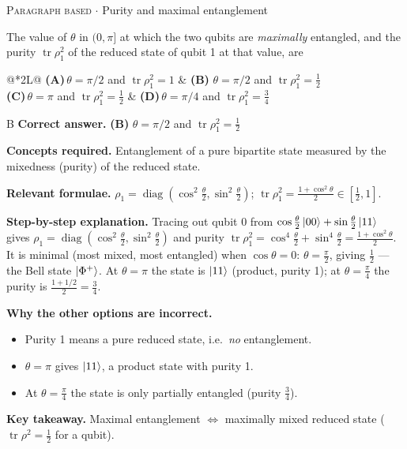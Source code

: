 \documentclass[11pt,a4paper]{article}
\newcommand{\optlabel}[1]{\textbf{(#1)}}
\newcommand{\correctlabel}[1]{\textcolor{okgreen}{\textbf{(#1)}\,\ding{51}}}
\newenvironment{qitem}[1]{\begin{list}{}{\setlength{\leftmargin}{3.3em}\setlength{\labelwidth}{3.1em}%
  \setlength{\labelsep}{0.2em}\setlength{\topsep}{3pt}\setlength{\parsep}{3pt}}\item[\textbf{Q.#1}\hfill]}{\end{list}}
\newcommand{\qsep}{\par\vspace{2pt}{\color{black!15}\hrule}\vspace{4pt}}
\newcommand{\qmeta}[2]{{\footnotesize\color{black!60}\textsc{#1} \;$\cdot$\; #2}\par}
\begin{document}
\begin{qitem}{40}
\qmeta{Paragraph based}{Purity and maximal entanglement}
The value of $\theta$ in $(0, \pi]$ at which the two qubits are \emph{maximally} entangled, and the purity
$\operatorname{tr}\rho_1^2$ of the reduced state of qubit 1 at that value, are
\par\smallskip\noindent\begin{tabularx}{\linewidth}{@{}*{2}{L}@{}}
\optlabel{A}\,$\theta = \pi/2$ and $\operatorname{tr}\rho_1^2 = 1$ & \correctlabel{B}\,$\theta = \pi/2$ and $\operatorname{tr}\rho_1^2 = \tfrac12$ \\[3pt]
\optlabel{C}\,$\theta = \pi$ and $\operatorname{tr}\rho_1^2 = \tfrac12$ & \optlabel{D}\,$\theta = \pi/4$ and $\operatorname{tr}\rho_1^2 = \tfrac34$
\end{tabularx}
\end{qitem}
\begin{solbox}{B}
\textbf{\color{brand}Correct answer.} \textcolor{okgreen}{\textbf{(B)}} $\theta = \pi/2$ and $\operatorname{tr}\rho_1^2 = \tfrac12$

\textbf{\color{brand}Concepts required.} Entanglement of a pure bipartite state measured by the mixedness (purity) of the reduced state.

\textbf{\color{brand}Relevant formulae.} $\rho_1 = \operatorname{diag}(\cos^2\frac\theta2, \sin^2\frac\theta2)$; $\operatorname{tr}\rho_1^2 = \frac{1 + \cos^2\theta}{2} \in [\frac12, 1]$.

\textbf{\color{brand}Step-by-step explanation.} Tracing out qubit 0 from $\cos\frac\theta2\ket{00} + \sin\frac\theta2\ket{11}$ gives $\rho_1 = \operatorname{diag}(\cos^2\frac\theta2, \sin^2\frac\theta2)$
and purity $\operatorname{tr}\rho_1^2 = \cos^4\frac\theta2 + \sin^4\frac\theta2 = \frac{1 + \cos^2\theta}{2}$. It is minimal (most mixed,
most entangled) when $\cos\theta = 0$: $\theta = \frac\pi2$, giving $\frac12$ --- the Bell state $\ket{\Phi^+}$.
At $\theta = \pi$ the state is $\ket{11}$ (product, purity 1); at $\theta = \frac\pi4$ the purity is $\frac{1 + 1/2}{2} = \frac34$.

\textbf{\color{brand}Why the other options are incorrect.}
\begin{itemize}[leftmargin=2.4em, itemsep=1pt, topsep=2pt]
\item[\textbf{(A)}] Purity 1 means a pure reduced state, i.e.\ \emph{no} entanglement.
\item[\textbf{(C)}] $\theta = \pi$ gives $\ket{11}$, a product state with purity 1.
\item[\textbf{(D)}] At $\theta = \frac\pi4$ the state is only partially entangled (purity $\frac34$).
\end{itemize}
\textbf{\color{brand}Key takeaway.} Maximal entanglement $\Leftrightarrow$ maximally mixed reduced state ($\operatorname{tr}\rho^2 = \frac12$ for a qubit).
\end{solbox}
\qsep
\end{document}
